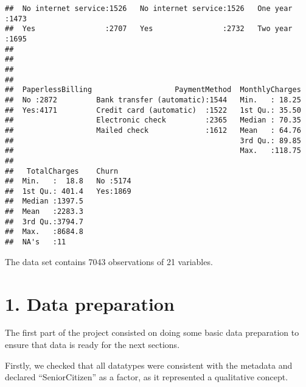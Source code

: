 \documentclass[
]{article}
\newenvironment{Shaded}{\begin{snugshade}}{\end{snugshade}}
\newcommand{\AttributeTok}[1]{\textcolor[rgb]{0.13,0.29,0.53}{#1}}
\newcommand{\FunctionTok}[1]{\textcolor[rgb]{0.13,0.29,0.53}{\textbf{#1}}}
\newcommand{\NormalTok}[1]{#1}
\newcommand{\OtherTok}[1]{\textcolor[rgb]{0.56,0.35,0.01}{#1}}
\newcommand{\SpecialCharTok}[1]{\textcolor[rgb]{0.81,0.36,0.00}{\textbf{#1}}}
\newcommand{\StringTok}[1]{\textcolor[rgb]{0.31,0.60,0.02}{#1}}
\begin{document}
\begin{verbatim}
##  No internet service:1526   No internet service:1526   One year      :1473  
##  Yes                :2707   Yes                :2732   Two year      :1695  
##                                                                             
##                                                                             
##                                                                             
##                                                                             
##  PaperlessBilling                   PaymentMethod  MonthlyCharges  
##  No :2872         Bank transfer (automatic):1544   Min.   : 18.25  
##  Yes:4171         Credit card (automatic)  :1522   1st Qu.: 35.50  
##                   Electronic check         :2365   Median : 70.35  
##                   Mailed check             :1612   Mean   : 64.76  
##                                                    3rd Qu.: 89.85  
##                                                    Max.   :118.75  
##                                                                    
##   TotalCharges    Churn     
##  Min.   :  18.8   No :5174  
##  1st Qu.: 401.4   Yes:1869  
##  Median :1397.5             
##  Mean   :2283.3             
##  3rd Qu.:3794.7             
##  Max.   :8684.8             
##  NA's   :11
\end{verbatim}

The data set contains 7043 observations of 21 variables.

\hypertarget{data-preparation}{%
\section{1. Data preparation}\label{data-preparation}}

The first part of the project consisted on doing some basic data
preparation to ensure that data is ready for the next sections.

Firstly, we checked that all datatypes were consistent with the metadata
and declared ``SeniorCitizen'' as a factor, as it represented a
qualitative concept.

\begin{Shaded}
\end{Shaded}
\end{document}
